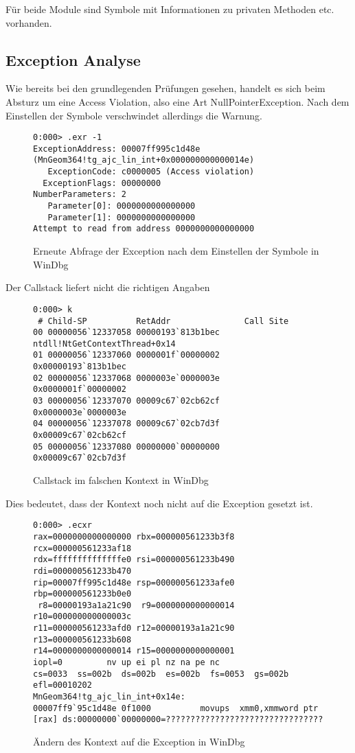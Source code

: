 Für beide Module sind Symbole mit Informationen zu privaten Methoden etc. vorhanden.

\subsection{Exception Analyse}

Wie bereits bei den grundlegenden Prüfungen gesehen, handelt es sich beim Absturz um eine Access Violation, also eine Art NullPointerException. Nach dem Einstellen der Symbole verschwindet allerdings die Warnung.

\begin{figure}[H]
\begin{lstlisting}
0:000> .exr -1
ExceptionAddress: 00007ff995c1d48e (MnGeom364!tg_ajc_lin_int+0x000000000000014e)
   ExceptionCode: c0000005 (Access violation)
  ExceptionFlags: 00000000
NumberParameters: 2
   Parameter[0]: 0000000000000000
   Parameter[1]: 0000000000000000
Attempt to read from address 0000000000000000
\end{lstlisting}
\caption{Erneute Abfrage der Exception nach dem Einstellen der Symbole in WinDbg}
\end{figure}

Der Callstack liefert nicht die richtigen Angaben

\begin{figure}[H]
\begin{lstlisting}
0:000> k
 # Child-SP          RetAddr               Call Site
00 00000056`12337058 00000193`813b1bec     ntdll!NtGetContextThread+0x14
01 00000056`12337060 0000001f`00000002     0x00000193`813b1bec
02 00000056`12337068 0000003e`0000003e     0x0000001f`00000002
03 00000056`12337070 00009c67`02cb62cf     0x0000003e`0000003e
04 00000056`12337078 00009c67`02cb7d3f     0x00009c67`02cb62cf
05 00000056`12337080 00000000`00000000     0x00009c67`02cb7d3f
\end{lstlisting}
\caption{Callstack im falschen Kontext in WinDbg}
\end{figure}

Dies bedeutet, dass der Kontext noch nicht auf die Exception gesetzt ist.

\begin{figure}[H]
\begin{lstlisting}
0:000> .ecxr
rax=0000000000000000 rbx=000000561233b3f8 rcx=000000561233af18
rdx=ffffffffffffffe0 rsi=000000561233b490 rdi=000000561233b470
rip=00007ff995c1d48e rsp=000000561233afe0 rbp=000000561233b0e0
 r8=00000193a1a21c90  r9=0000000000000014 r10=000000000000003c
r11=000000561233afd0 r12=00000193a1a21c90 r13=000000561233b608
r14=0000000000000014 r15=0000000000000001
iopl=0         nv up ei pl nz na pe nc
cs=0033  ss=002b  ds=002b  es=002b  fs=0053  gs=002b             efl=00010202
MnGeom364!tg_ajc_lin_int+0x14e:
00007ff9`95c1d48e 0f1000          movups  xmm0,xmmword ptr [rax] ds:00000000`00000000=????????????????????????????????
\end{lstlisting}
\caption{Ändern des Kontext auf die Exception in WinDbg}
\end{figure}

